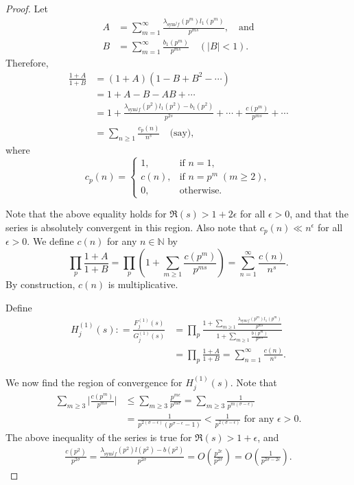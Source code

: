 \documentclass[10pt]{amsart}
\begin{document}
\begin{proof}
       Let 
\begin{align*}
    A &= \sum_{m=1}^{\infty} \frac{\lambda_{\mathrm{sym}^jf}(p^m)l_1(p^m)}{p^{ms}}, \quad \text{and} \\
    B &= \sum_{m=1}^{\infty}\frac{b_1(p^m)}{p^{ms}} \quad (|B| < 1).
\end{align*}
Therefore,
\begin{align*}
    \frac{1+A}{1+B} 
    &= (1+A)(1 - B + B^2 - \cdots) \\
    &= 1 + A - B - AB + \cdots \\
    &= 1 + \frac{\lambda_{\mathrm{sym}^jf}(p^2)l_1(p^2)-b_1(p^2)}{p^{2s}} + \cdots + \frac{c(p^m)}{p^{ms}} + \cdots \\
    &= \sum_{n \geq 1} \frac{c_p(n)}{n^s} \quad \text{(say)},
\end{align*}
where
\begin{equation*}
    c_p(n) = 
    \begin{cases}
        1, & \text{if } n=1, \\
        c(n), & \text{if } n = p^m \; (m \geq 2), \\
        0, & \text{otherwise.}
    \end{cases}
\end{equation*}


Note that the above equality holds for $\Re(s) > 1+2\epsilon$ for all $\epsilon > 0$, and that the series is absolutely convergent in this region.
        Also note that $c_p(n) \ll n^\epsilon$ for all $\epsilon > 0$.
        We define $c(n)$ for any $n \in \mathbb{N}$ by $$\prod_{p}\frac{1+A}{1+B} = \prod_p\left( 1+ \sum_{m \geq 1}\frac{c(p^m)}{p^{ms}}\right) = \sum_{n=1}^{\infty}\frac{c(n)}{n^s}.$$
        By construction, $c(n)$ is multiplicative.

     Define \begin{align*}
             H_j^{(1)}(s) : = \frac{F_j^{(1)}(s)}{G_j^{(1)}(s)} &=\prod_{p} \frac{1+ \sum_{m \geq 1}\frac{\lambda_{\mathrm{sym}^jf}(p^m)l_1(p^m)}{p^{ms}}}{1+\sum_{m\geq1}\frac{b(p^m)}{p^{ms}}} \\
             &= \prod_p \frac{1+A}{1+B} = \sum_{n=1}^{\infty}\frac{c(n)}{n^s}.
         \end{align*}

         We now find the region of convergence for $H_j^{(1)}(s)$. Note that \begin{align*}
             \sum_{m \geq 3}\bigg|\frac{c(p^m)}{p^{ms}}\bigg| &\leq \sum_{m\geq 3}\frac{p^{m\epsilon}}{p^{m\sigma}} = \sum_{m \geq 3} \frac{1}{p^{m(\sigma - \epsilon)}} \\
             &= \frac{1}{p^{2(\sigma-\epsilon)}(p^{\sigma -\epsilon}-1)} < \frac{1}{p^{2(\sigma-\epsilon)}} \text{ for any } \epsilon >0.
         \end{align*} The above inequality of the series is true for $\Re(s)> 1+\epsilon$, and\begin{align*}
             \frac{c(p^2)}{p^{2\sigma}} = \frac{\lambda_{\mathrm{sym}^jf}(p^2)l(p^2) - b(p^2)}{p^{2\sigma}} 
             = O\left(\frac{p^{2\epsilon}}{p^{2\sigma}}\right) = O\left(\frac{1}{p^{2\sigma-2\epsilon}}\right).
         \end{align*}


\end{proof}
\end{document}
